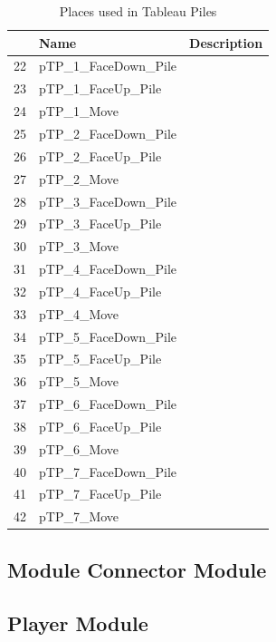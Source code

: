\documentclass[runningheads,a4paper]{llncs}
\begin{document}
\begin{table}
	\caption{Places used in Tableau Piles}
	\begin{tabular}{|l|l|l|}
		\hline
		& Name & Description \\
		\hline
		22 & pTP\_1\_FaceDown\_Pile    &  \\ \hline
		23 & pTP\_1\_FaceUp\_Pile      &  \\ \hline
		24 & pTP\_1\_Move              &  \\ \hline
		25 & pTP\_2\_FaceDown\_Pile    &  \\ \hline
		26 & pTP\_2\_FaceUp\_Pile      &  \\ \hline
		27 & pTP\_2\_Move              &  \\ \hline
		28 & pTP\_3\_FaceDown\_Pile    &  \\ \hline
		29 & pTP\_3\_FaceUp\_Pile      &  \\ \hline
		30 & pTP\_3\_Move              &  \\ \hline
		31 & pTP\_4\_FaceDown\_Pile    &  \\ \hline
		32 & pTP\_4\_FaceUp\_Pile      &  \\ \hline
		33 & pTP\_4\_Move              &  \\ \hline
		34 & pTP\_5\_FaceDown\_Pile    &  \\ \hline
		35 & pTP\_5\_FaceUp\_Pile      &  \\ \hline
		36 & pTP\_5\_Move              &  \\ \hline
		37 & pTP\_6\_FaceDown\_Pile    &  \\ \hline
		38 & pTP\_6\_FaceUp\_Pile      &  \\ \hline
		39 & pTP\_6\_Move              &  \\ \hline
		40 & pTP\_7\_FaceDown\_Pile    &  \\ \hline
		41 & pTP\_7\_FaceUp\_Pile      &  \\ \hline
		42 & pTP\_7\_Move              &  \\ \hline
	\end{tabular}
\end{table}
\subsection{Module Connector Module}

\subsection{Player Module}
\end{document}
